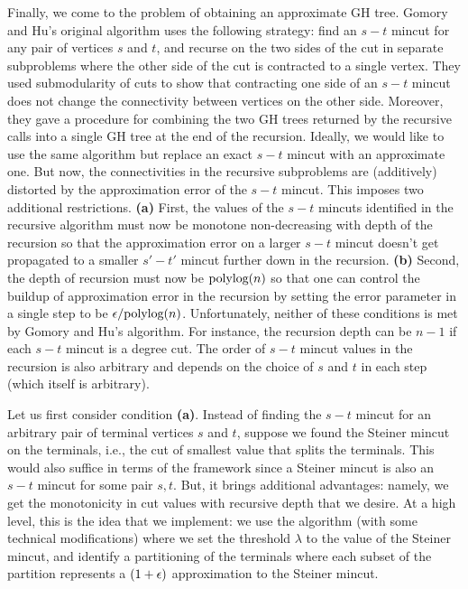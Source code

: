 Finally, we come to the problem of obtaining an approximate GH tree. Gomory and Hu's original algorithm uses the following strategy: find an $s-t$ mincut for any pair of vertices $s$ and $t$, and recurse on the two sides of the cut in separate subproblems where the other side of the cut is contracted to a single vertex. They used submodularity of cuts to show that contracting one side of an $s-t$ mincut does not change the connectivity between vertices on the other side. Moreover, they gave a procedure for combining the two GH trees returned by the recursive calls into a single GH tree at the end of the recursion. Ideally, we would like to use the same algorithm but replace an exact $s-t$ mincut with an approximate one. But now, the connectivities in the recursive subproblems are (additively) distorted by the approximation error of the $s-t$ mincut. This imposes two additional restrictions. {\bf (a)} First, the values of the $s-t$ mincuts identified in the recursive algorithm must now be monotone non-decreasing with depth of the recursion so that the approximation error on a larger $s-t$ mincut doesn't get propagated to a smaller $s'-t'$ mincut further down in the recursion. {\bf (b)} Second, the depth of recursion must now be $\textup{polylog}(n)$ so that one can control the buildup of approximation error in the recursion by setting the error parameter in a single step to be $\epsilon/\textup{polylog}(n)$. Unfortunately, neither of these conditions is met by Gomory and Hu's algorithm. For instance, the recursion depth can be $n-1$ if each $s-t$ mincut is a degree cut. The order of $s-t$ mincut values in the recursion is also arbitrary and depends on the choice of $s$ and $t$ in each step (which itself is arbitrary).

Let us first consider condition {\bf (a)}. Instead of finding the $s-t$ mincut for an arbitrary pair of terminal vertices $s$ and $t$, suppose we found the Steiner mincut on the terminals, i.e., the cut of smallest value that splits the terminals. This would also suffice in terms of the framework since a Steiner mincut is also an $s-t$ mincut for some pair $s, t$. But, it brings additional advantages: namely, we get the monotonicity in cut values with recursive depth that we desire. At a high level, this is the idea that we implement: we use the \ct algorithm (with some technical modifications) where we set the threshold $\lambda$ to the value of the Steiner mincut, and identify a partitioning of the terminals where each subset of the partition represents a $(1+\epsilon)$ approximation to the Steiner mincut. 

